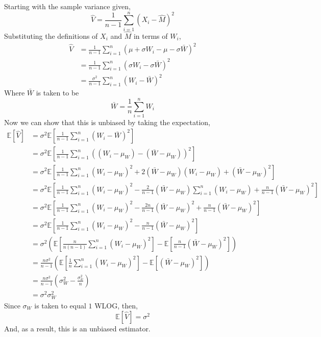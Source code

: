 \documentclass[12pt,twoside]{article}
\begin{document}
\begin{problems}
\begin{problemparts}
Starting with the sample variance given,
$$ \hat{V} = \frac{1}{n - 1} \sum_{i = 1}^n \left(X_i - \hat{M}\right)^2 $$
Substituting the definitions of $X_i$ and $\hat{M}$ in terms of $W_i$,
\begin{align*}
    \hat{V} &= \frac{1}{n - 1} \sum_{i = 1}^n \left(\mu + \sigma W_i - \mu - 
    \sigma \bar{W}\right)^2 \\
    &= \frac{1}{n - 1} \sum_{i = 1}^n \left(\sigma W_i - \sigma \bar{W}\right)^2 \\
    &= \frac{\sigma^2}{n - 1} \sum_{i = 1}^n \left(W_i - \bar{W}\right)^2
\end{align*}
Where $\bar{W}$ is taken to be
$$ \bar{W} = \frac{1}{n} \sum_{i = 1}^n W_i $$
Now we can show that this is unbiased by taking the expectation,
\begin{align*}
    \mathbb{E}[\hat{V}] &= \sigma^2 \mathbb{E}\left[\frac{1}{n - 1} \sum_{i = 
    1}^n \left(W_i - \bar{W}\right)^2\right] \\
    &= \sigma^2 \mathbb{E}\left[\frac{1}{n - 1} \sum_{i = 1}^n \left((W_i - \mu_W) 
    - (\bar{W} - \mu_W)\right)^2\right] \\
    &= \sigma^2 \mathbb{E}\left[\frac{1}{n - 1} \sum_{i = 1}^n (W_i - \mu_W)^2 + 2
    (\bar{W} - \mu_W) (W_i - \mu_W) +(\bar{W} - \mu_W)^2\right] \\
    &= \sigma^2 \mathbb{E}\left[\frac{1}{n - 1}\sum_{i = 1}^n (W_i - \mu_W)^2 - 
    \frac{2}{n - 1} (\bar{W} - \mu_W) \sum_{i = 1}^n (W_i - \mu_W) + \frac{n}{n - 1}
    (\bar{W} - \mu_W)^2\right] \\
    &= \sigma^2 \mathbb{E}\left[\frac{1}{n - 1}\sum_{i = 1}^n (W_i - \mu_W)^2 - 
    \frac{2n}{n - 1} (\bar{W} - \mu_W)^2 + \frac{n}{n - 1} (\bar{W} - \mu_W)^2\right] \\
    &= \sigma^2 \mathbb{E}\left[\frac{1}{n - 1}\sum_{i = 1}^n (W_i - \mu_W)^2 - 
    \frac{n}{n - 1} (\bar{W} - \mu_W)^2 \right] \\
    &= \sigma^2 \left(\mathbb{E}\left[\frac{n}{n(n - 1)} \sum_{i = 1}^n (W_i - 
    \mu_W)^2\right] - \mathbb{E}\left[\frac{n}{n - 1} (\bar{W} - \mu_W)^2\right]\right) \\
    &= \frac{n \sigma^2}{n - 1} \left(\mathbb{E}\left[\frac{1}{n}\sum_{i = 1}^n (W_i - 
    \mu_W)^2\right] - \mathbb{E}\left[(\bar{W} - \mu_W)^2\right]\right) \\
    &= \frac{n \sigma^2}{n - 1} \left(\sigma_W^2 - \frac{\sigma_w^2}{n}\right) \\
    &= \sigma^2 \sigma_W^2
\end{align*}
Since $\sigma_W$ is taken to equal $1$ WLOG, then,
$$ \mathbb{E}[\hat{V}] = \boxed{\sigma^2} $$
And, as a result, this is an unbiased estimator.


\end{problemparts}
\end{problems}
\end{document}
